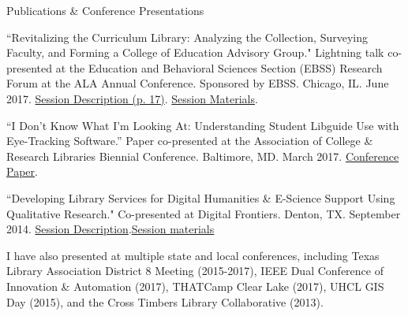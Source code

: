 \documentclass{resume} %
\begin{document}
\begin{rSection}{Publications \& Conference Presentations}
\begin{rSubsectionConf}{2em}
``Revitalizing the Curriculum Library: Analyzing the Collection, Surveying Faculty, and Forming a College of Education Advisory Group." Lightning talk co-presented at the Education and Behavioral Sciences Section (EBSS) Research Forum at the ALA Annual Conference. Sponsored by EBSS. Chicago, IL. June 2017. \href{http://www.ala.org/acrl/sites/ala.org.acrl/files/content/aboutacrl/directoryofleadership/sections/ebss/ebsswebsite/ebssnewsletter/ebss_fall2017.pdf}{Session Description (p. 17)}. \href{http://www.ala.org/acrl/aboutacrl/directoryofleadership/sections/ebss/ebsswebsite/poster-forum}{Session Materials}. 

``I Don’t Know What I’m Looking At: Understanding Student Libguide Use with Eye-Tracking Software.” Paper co-presented at the Association of College \& Research Libraries Biennial Conference. Baltimore, MD. March 2017. \href{http://www.ala.org/acrl/sites/ala.org.acrl/files/content/conferences/confsandpreconfs/2017/IDontKnowWhatImLookingat.pdf}{Conference Paper}.

``Developing Library Services for Digital Humanities \& E-Science Support Using Qualitative Research." Co-presented at Digital Frontiers. Denton, TX. September 2014. \href{https://rafiamirzasite.wordpress.com/2016/03/13/developing-library-services-for-digital-humanities/}{Session Description}.\href{https://www.slideshare.net/librarianrafia/digital-frontiers-2014}{Session materials}
\end{rSubsectionConf}

I have also presented at multiple state and local conferences, including Texas Library Association District 8 Meeting (2015-2017), IEEE Dual Conference of Innovation \& Automation (2017), THATCamp Clear Lake (2017), UHCL GIS Day (2015), and the Cross Timbers Library Collaborative (2013).


\end{rSection}

\pagebreak
\end{document}
